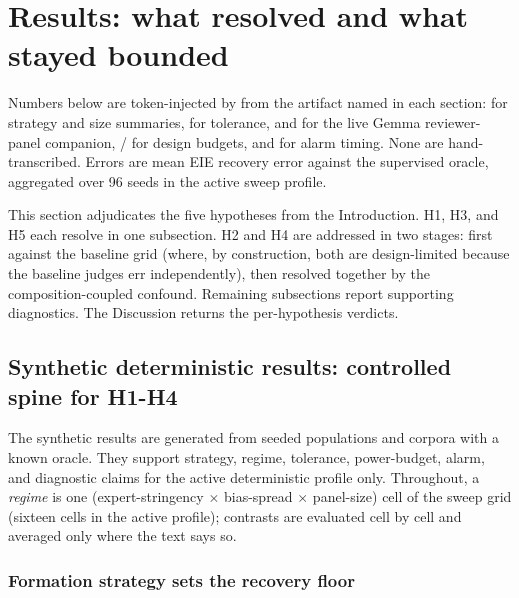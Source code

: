 \documentclass[
]{article}
\begin{document}
\newpage

\section{Results: what resolved and what stayed
bounded}\label{results-what-resolved-and-what-stayed-bounded}

Numbers below are token-injected by
 from the artifact
named in each section:  for strategy and
size summaries,  for tolerance,
 and
 for the live Gemma
reviewer-panel companion,  /
 for design budgets, and
 for alarm timing. None are hand-transcribed.
Errors are mean EIE recovery error against the supervised oracle,
aggregated over 96 seeds in the active sweep profile.

This section adjudicates the five hypotheses from the Introduction. H1,
H3, and H5 each resolve in one subsection. H2 and H4 are addressed in
two stages: first against the baseline grid (where, by construction,
both are design-limited because the baseline judges err independently),
then resolved together by the composition-coupled confound. Remaining
subsections report supporting diagnostics. The Discussion returns the
per-hypothesis verdicts.

\subsection{Synthetic deterministic results: controlled spine for
H1-H4}\label{synthetic-deterministic-results-controlled-spine-for-h1-h4}

The synthetic results are generated from seeded populations and corpora
with a known oracle. They support strategy, regime, tolerance,
power-budget, alarm, and diagnostic claims for the active deterministic
profile only. Throughout, a \emph{regime} is one (expert-stringency \texorpdfstring{\ensuremath{\times}}{x}
bias-spread \texorpdfstring{\ensuremath{\times}}{x} panel-size) cell of the sweep grid (sixteen cells in the
active profile); contrasts are evaluated cell by cell and averaged only
where the text says so.

\subsubsection{Formation strategy sets the recovery
floor}\label{formation-strategy-sets-the-recovery-floor}
\end{document}
